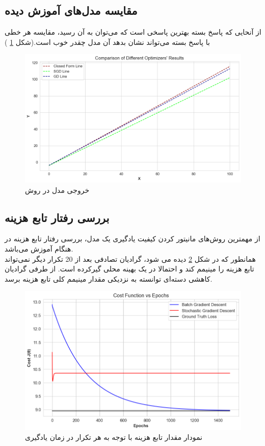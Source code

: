 \documentclass{article}
\begin{document}
		 
	\subsection{مقایسه مدل‌های آموزش دیده}
	از آنحایی که پاسخ بسته بهترین پاسخی است که می‌توان به آن رسید، مقایسه هر خطی با پاسخ بسته می‌تواند نشان بدهد آن مدل چقدر خوب است.(شکل 
	\ref{fig: lines one var}
	)
	\begin{figure}[H]
		\centering
		\includegraphics[scale=0.5]{figs/lines_one_var}
		\caption{خروجی مدل در روش}
		\label{fig: lines one var}
	\end{figure}
	
	\subsection{بررسی رفتار تابع هزینه}\label{resuling}
	از مهمترین روش‌های مانیتور کردن کیفیت یادگیری یک مدل، بررسی رفتار تابع هزینه در هنگام آموزش می‌باشد.\\
	همانطور که در شکل
	\ref{fig: cost one var}
	دیده می شود، گرادیان تصادفی بعد از 20 تکرار دیگر نمی‌تواند تابع هزینه را مینیمم کند و احتمالا در یک بهینه محلی گیرکرده است. از طرفی گرادیان کاهشی دسته‌ای توانسته به نزدیکی مقدار مینیمم کلی تابع هزینه برسد.
	\begin{figure}[H]
		\centering
		\includegraphics[scale=0.5]{figs/costvsepoch_one_var}
		\caption{نمودار مقدار تابع هزینه با توجه به هر تکرار در زمان یادگیری}
		\label{fig: cost one var}
	\end{figure}
\end{document}
